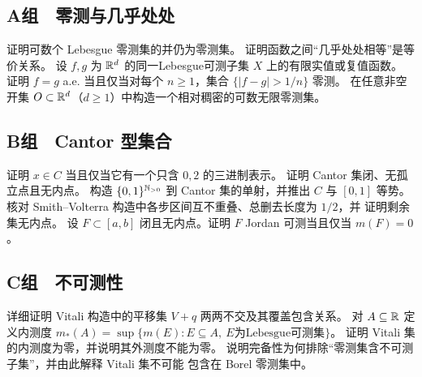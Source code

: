 \subsection*{A组　零测与几乎处处}
\begin{enumerate}[label=\textbf{\thechapter.\arabic*.}]
 证明可数个 Lebesgue 零测集的并仍为零测集。
 证明函数之间“几乎处处相等”是等价关系。
 设 $f,g$ 为 $\mathbb{R}^d$ 的同一Lebesgue可测子集 $X$ 上的有限实值或复值函数。
 证明 $f=g$ a.e. 当且仅当对每个 $n\ge1$，集合
 $\{|f-g|>1/n\}$ 零测。
 在任意非空开集 $O\subset\mathbb{R}^d$（$d\ge1$）中构造一个相对稠密的可数无限零测集。
\end{enumerate}

\subsection*{B组　Cantor 型集合}
\begin{enumerate}[label=\textbf{\thechapter.\arabic*.},resume]
 证明 $x\in C$ 当且仅当它有一个只含 $0,2$ 的三进制表示。
 证明 Cantor 集闭、无孤立点且无内点。
 构造 $\{0,1\}^{\mathbb{N}_{>0}}$ 到 Cantor 集的单射，并推出 $C$ 与 $[0,1]$
 等势。
 核对 Smith--Volterra 构造中各步区间互不重叠、总删去长度为 $1/2$，并
 证明剩余集无内点。
 设 $F\subset[a,b]$ 闭且无内点。证明 $F$ Jordan 可测当且仅当
 $m(F)=0$。
\end{enumerate}

\subsection*{C组　不可测性}
\begin{enumerate}[label=\textbf{\thechapter.\arabic*.},resume]
 详细证明 Vitali 构造中的平移集 $V+q$ 两两不交及其覆盖包含关系。
 对 $A\subseteq\mathbb{R}$ 定义内测度
 $m_*(A)=\sup\{m(E):E\subseteq A,\ E\text{为Lebesgue可测集}\}$。
 证明 Vitali 集的内测度为零，并说明其外测度不能为零。
 说明完备性为何排除“零测集含不可测子集”，并由此解释 Vitali 集不可能
 包含在 Borel 零测集中。
\end{enumerate}
